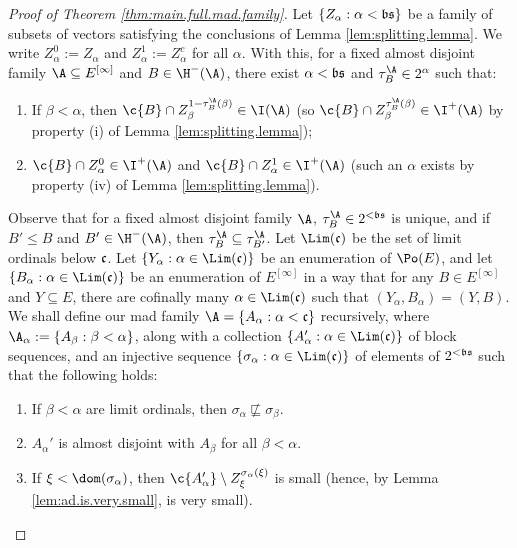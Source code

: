 \documentclass[11pt,reqno]{amsart}
\begin{document}
\begin{proof}[Proof of Theorem \ref{thm:main.full.mad.family}]
    Let $\{Z_\alpha : \alpha < \frak{bs}\}$ be a family of subsets of vectors satisfying the conclusions of Lemma \ref{lem:splitting.lemma}. We write $Z_\alpha^0 := Z_\alpha$ and $Z_\alpha^1 := Z_\alpha^c$ for all $\alpha$. With this, for a fixed almost disjoint family $\A \subseteq E^{[\infty]}$ and $B \in \H^-(\A)$, there exist $\alpha < \frak{bs}$ and $\tau_B^\A \in 2^\alpha$ such that:
    \begin{enumerate}
        \item If $\beta < \alpha$, then $\c{B} \cap Z_\beta^{1-\tau_B^\A(\beta)} \in \I(\A)$ (so $\c{B} \cap Z_\beta^{\tau_B^\A(\beta)} \in \I^+(\A)$ by property (i) of Lemma \ref{lem:splitting.lemma});

        \item $\c{B} \cap Z_\alpha^0 \in \I^+(\A)$ and $\c{B} \cap Z_\alpha^1 \in \I^+(\A)$ (such an $\alpha$ exists by property (iv) of Lemma \ref{lem:splitting.lemma}). 
    \end{enumerate}
    Observe that for a fixed almost disjoint family $\A$, $\tau_B^\A \in 2^{<\frak{bs}}$ is unique, and if $B' \leq B$ and $B' \in \H^-(\A)$, then $\tau_B^\A \subseteq \tau_{B'}^\A$. Let $\Lim(\frak{c})$ be the set of limit ordinals below $\frak{c}$. Let $\{Y_\alpha : \alpha \in \Lim(\frak{c})\}$ be an enumeration of $\Po(E)$, and let $\{B_\alpha : \alpha \in \Lim(\frak{c})\}$ be an enumeration of $E^{[\infty]}$ in a way that for any $B \in E^{[\infty]}$ and $Y \subseteq E$, there are cofinally many $\alpha \in \Lim(\frak{c})$ such that $(Y_\alpha,B_\alpha) = (Y,B)$. We shall define our mad family $\A = \{A_\alpha : \alpha < \frak{c}\}$ recursively, where $\A_\alpha := \{A_\beta : \beta < \alpha\}$, along with a collection $\{A_\alpha' : \alpha \in \Lim(\frak{c})\}$ of block sequences, and an injective sequence $\{\sigma_\alpha : \alpha \in \Lim(\frak{c})\}$ of elements of $2^{<\frak{bs}}$ such that the following holds:
    \begin{enumerate}
        \item If $\beta < \alpha$ are limit ordinals, then $\sigma_\alpha \not\sqsubseteq \sigma_\beta$.

        \item $A_\alpha'$ is almost disjoint with $A_\beta$ for all $\beta < \alpha$.

        \item If $\xi < \dom(\sigma_\alpha)$, then $\c{A_\alpha'} \setminus Z_\xi^{\sigma_\alpha(\xi)}$ is small (hence, by Lemma \ref{lem:ad.is.very.small}, is very small).


\end{enumerate}
\end{proof}
\end{document}
